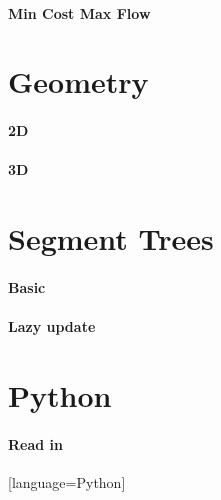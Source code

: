 \documentclass[a4paper]{article}
\begin{document}
\paragraph{Min Cost Max Flow} \hfill

\section{Geometry}
\paragraph{2D} \hfill

\paragraph{3D} \hfill

\section{Segment Trees}
\paragraph{Basic} \hfill

\paragraph{Lazy update} \hfill

\section{Python}
\paragraph{Read in} \hfill
[language=Python]
\end{document}
